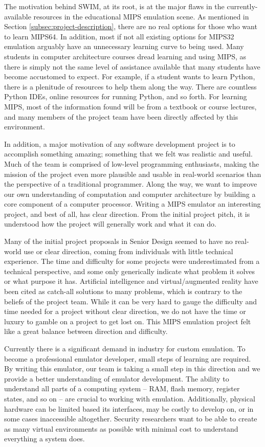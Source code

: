 \documentclass[
    paper=letter,
    parskip=half,
    fontsize=12pt,
    titlepage=firstiscover,
    toc=bibliography,
    numbers=endperiod
]{scrartcl}
\begin{document}
The motivation behind SWIM, at its root, is at the major flaws in the
currently-available resources in the educational MIPS emulation scene.
As mentioned in Section \ref{subsec:project-description}, there are no
real options for those who want to learn MIPS64. In addition, most if
not all existing options for MIPS32 emulation arguably have an
unnecessary learning curve to being used. Many students in computer
architecture courses dread learning and using MIPS, as there is simply
not the same level of assistance available that many students have
become accustomed to expect. For example, if a student wants to learn
Python, there is a plenitude of resources to help them along the way.
There are countless Python IDEs, online resources for running Python,
and so forth. For learning MIPS, most of the information found will be
from a textbook or course lectures, and many members of the project team
have been directly affected by this environment.

In addition, a major motivation of any software development project is
to accomplish something amazing; something that we felt was realistic
and useful. Much of the team is comprised of low-level programming
enthusiasts, making the mission of the project even more plausible and
usable in real-world scenarios than the perspective of a traditional
programmer. Along the way, we want to improve our own understanding of
computation and computer architecture by building a core component of a
computer processor. Writing a MIPS emulator an interesting project, and
best of all, has clear direction. From the initial project pitch, it is
understood how the project will generally work and what it can do.

Many of the initial project proposals in Senior Design seemed to have no
real-world use or clear direction, coming from individuals with little
technical experience. The time and difficulty for some projects were
underestimated from a technical perspective, and some only generically
indicate what problem it solves or what purpose it has. Artificial
intelligence and virtual/augmented reality have been cited as catch-all
solutions to many problems, which is contrary to the beliefs of the
project team. While it can be very hard to gauge the difficulty and time
needed for a project without clear direction, we do not have the time or
luxury to gamble on a project to get lost on. This MIPS emulation
project felt like a great balance between direction and difficulty.

Currently there is a significant demand in industry for custom
emulation. To become a professional emulator developer, small steps of
learning are required. By writing this emulator, our team is taking a
small step in this direction and we provide a better understanding of
emulator development. The ability to understand all parts of a computing
system -- RAM, flash memory, register states, and so on -- are crucial
to working with emulation. Additionally, physical hardware can be
limited based its interfaces, may be costly to develop on, or in some
cases inaccessible altogether. Security researchers want to be able to
create as many virtual environments as possible with minimal cost to
understand everything a system does.
\end{document}
